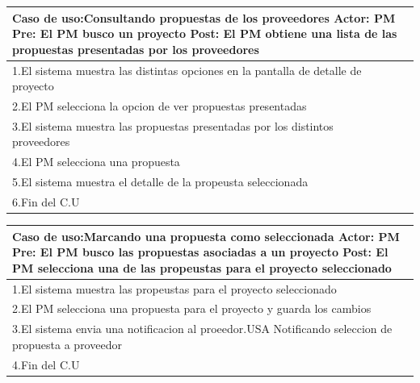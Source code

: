 \begin{longtable}{|p{}|p{}|}
    \hline
    \multicolumn{2}{|p{16cm}|}{
        \textbf{Caso de uso:}Consultando propuestas de los proveedores\newline
        \textbf{Actor:} PM\newline
        \textbf{Pre: }El PM busco un proyecto\newline
        \textbf{Post:} El PM obtiene una lista de las propuestas presentadas por los proveedores
    }\\
    \hline
    1.El sistema muestra las distintas opciones en la pantalla de detalle de proyecto& \\
    \hline
    2.El PM selecciona la opcion de ver propuestas presentadas&\\
    \hline
    3.El sistema muestra las propuestas presentadas por los distintos proveedores & \\
    \hline
    4.El PM selecciona una propuesta  &\\
    \hline
    5.El sistema muestra el detalle de la propeusta seleccionada&\\
    \hline
    6.Fin del C.U&\\
    \hline
\end{longtable}

\begin{longtable}{|p{}|p{}|}
    \hline
    \multicolumn{2}{|p{16cm}|}{
        \textbf{Caso de uso:}Marcando una propuesta como seleccionada\newline
        \textbf{Actor:} PM\newline
        \textbf{Pre: }El PM busco las propuestas asociadas a un proyecto\newline
        \textbf{Post:} El PM selecciona una de las propeustas para el proyecto seleccionado
    }\\
    \hline
    1.El sistema muestra las propeustas para el proyecto seleccionado& \\
    \hline
    2.El PM selecciona una propuesta para el proyecto y guarda los cambios&\\
    \hline
    3.El sistema envia una notificacion al proeedor.USA Notificando seleccion de propuesta a proveedor& \\
    \hline
    4.Fin del C.U&\\
    \hline
\end{longtable}

